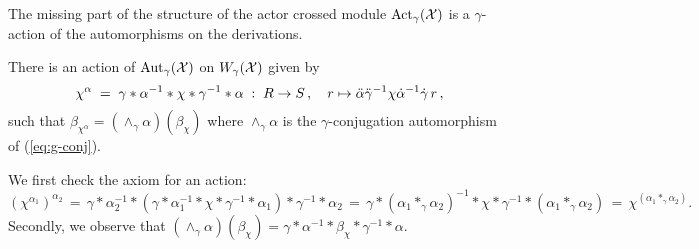 The missing part of the structure of the actor crossed module 
$\mathrm{Act}_{\gamma}(\mathcal{X})$ is a $\gamma$-action of the automorphisms 
on the derivations. 

\begin{lem} \label{lem:AonW}
There is an action of  $\mathrm{Aut}_{\gamma}(\mathcal{X})$  on  $W_{\gamma}(\mathcal{X})$  
given by
$$
\chi^{\alpha} \;=\; \gamma * \alpha^{-1} * \chi * \gamma^{-1} * \alpha 
             \;:\; R \to S\,,
    \quad r \mapsto \ddot{\alpha} \ddot{\gamma}^{-1} \chi \dot{\alpha}^{-1} \dot{\gamma} \,r\,, 
$$
such that $\beta_{\chi^{\alpha}} = (\wedge_{\gamma}\alpha)(\beta_{\chi})$ 
where $\wedge_{\gamma}\alpha$ is the $\gamma$-conjugation automorphism 
of (\ref{eq:g-conj}). 
\end{lem}
\begin{pf} 
We first check the axiom for an action: 
$$
(\chi^{\alpha_1})^{\alpha_2}
\,=\, \gamma*\alpha_2^{-1}*
         (\gamma*\alpha_1^{-1}*\chi*\gamma^{-1}*\alpha_1)*
             \gamma^{-1}*\alpha_2
\,=\, \gamma*(\alpha_1\ast_{\gamma}\alpha_2)^{-1}*
         \chi*\gamma^{-1}*(\alpha_1\ast_{\gamma}\alpha_2)
\,=\, \chi^{(\alpha_1\ast_{\gamma}\alpha_2)}.
$$
Secondly, we observe that 
$(\wedge_{\gamma}\alpha)(\beta_{\chi}) 
 = \gamma*\alpha^{-1}*\beta_{\chi}*\gamma^{-1}*\alpha$. 
\end{pf}

